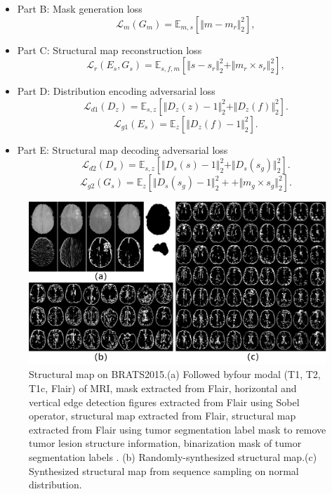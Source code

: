 \documentclass[runningheads]{llncs}
\begin{document}
	\begin{itemize}
		\item{Part B: Mask generation loss}
		\begin{equation}
		\mathcal{L}_{m}(G_m)=\mathbb{E}_{m,s}[\Vert{m-m_r}\Vert_{2}^{2}],
		\end{equation}
		\item{Part C: Structural map reconstruction loss} 
		\begin{equation}
		\mathcal{L}_{r}(E_s,G_s)=\mathbb{E}_{s,f,m}[\Vert{s-s_r}\Vert_{2}^{2}+\Vert{m_r\times s_r}\Vert_{2}^{2}],
		\end{equation}
		\item{Part D: Distribution encoding adversarial loss} 
		\begin{equation}
		\mathcal{L}_{d1}(D_{z})=\mathbb{E}_{s,z}[\Vert{D_{z}(z)-1}\Vert_{2}^{2}+\Vert{D_{z}(f)}\Vert_{2}^{2}].
		\end{equation}
		\begin{equation}
		\mathcal{L}_{g1}(E_s)=\mathbb{E}_{z}[\Vert{D_{z}(f)-1}\Vert_{2}^{2}].	
		\end{equation}
		\item{Part E: Structural map decoding adversarial loss} 
		\begin{equation}
		\mathcal{L}_{d2}(D_{s})=\mathbb{E}_{s,z}[\Vert{D_{s}(s)-1}\Vert_{2}^{2}+\Vert{D_{s}(s_g)}\Vert_{2}^{2}].
		\end{equation}
		\begin{equation}
		\mathcal{L}_{g2}(G_s)=\mathbb{E}_{z}[\Vert{D_{s}(s_g)-1}\Vert_{2}^{2}++\Vert{m_g\times s_g}\Vert_{2}^{2}].	
		\end{equation}
	\end{itemize}
	\begin{figure}[thbp!]
		\centering
		\includegraphics[width=0.85\linewidth]{figures/brats_f}
		\caption{Structural map on BRATS2015.(a) Followed byfour modal (T1, T2, T1c, Flair) of MRI, 
			mask extracted from Flair, horizontal and vertical edge detection figures extracted from Flair using Sobel operator, structural map extracted from Flair, structural map extracted from Flair using tumor segmentation label mask to remove tumor lesion structure information, binarization mask of tumor segmentation labels .
			(b) Randomly-synthesized structural map.(c) Synthesized structural map from sequence sampling on normal distribution.}
		\label{generated_f}
	\end{figure}
\end{document}

